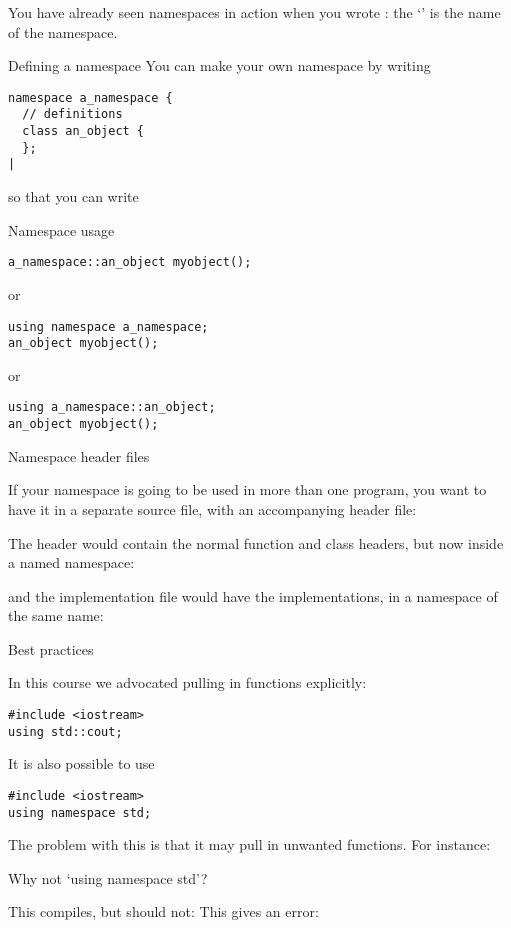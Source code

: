 You have already seen namespaces in action when you wrote
: the `' is the name of the namespace.

\begin{block}{Defining a namespace}
  \label{sl:namespace-def}
  You can make your own namespace by writing
\begin{verbatim}
namespace a_namespace {
  // definitions
  class an_object { 
  };
|
\end{verbatim}
\end{block}

so that you can write
\begin{block}{Namespace usage}
  \label{sl:namespace-use}
\begin{verbatim}
a_namespace::an_object myobject();
\end{verbatim}
or
\begin{verbatim}
using namespace a_namespace;
an_object myobject();
\end{verbatim}
or
\begin{verbatim}
using a_namespace::an_object;
an_object myobject();
\end{verbatim}
\end{block}

 {Namespace header files}

If your namespace is going to be used in more than one program, you
want to have it in a separate source file, with an accompanying header
file:
%

The header would contain the normal function and class headers, but
now inside a named namespace:
%

and the implementation file would have the implementations, in a
namespace of the same name:
%

 {Best practices}

In this course we advocated
pulling in functions explicitly:
\begin{verbatim}
#include <iostream>
using std::cout;
\end{verbatim}

It is also possible to use
\begin{verbatim}
#include <iostream>
using namespace std;
\end{verbatim}

The problem with this
is that it may pull in unwanted functions. For instance:

\begin{block}{Why not `using namespace std'?}
  \label{sl:namespace-std-harm}
  \begin{multicols}{2}
    This compiles, but should not:
    \vfill\columnbreak
    This gives an error:
  \end{multicols}
\end{block}

